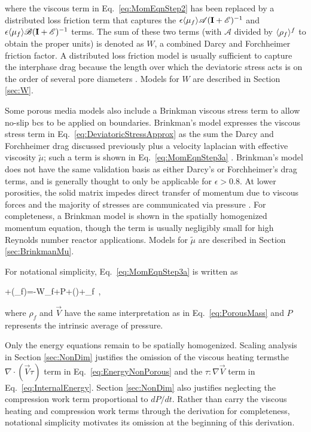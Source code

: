 \noindent where the viscous term in Eq.\ \eqref{eq:MomEqnStep2} has been replaced by a distributed loss friction term that captures the  \(\epsilon\langle\mu_f\rangle\mathscr{A}(\textbf{I}+\mathscr{E})^{-1}\) and \(\epsilon\langle\mu_f\rangle\mathscr{B}(\textbf{I}+\mathscr{E})^{-1}\) terms. The sum of these two terms (with \(\mathscr{A}\) divided by \(\langle\rho_f\rangle^f\) to obtain the proper units) is denoted as \(W\), a combined Darcy and Forchheimer friction factor. A distributed loss friction model is usually sufficient to capture the interphase drag because the length over which the deviatoric stress acts is on the order of several pore diameters \cite{kececioglu}. Models for \(W\) are described in Section \ref{sec:W}.

Some porous media models also include a Brinkman viscous stress term to allow no-slip \glspl{bc} to be applied on boundaries. Brinkman's model expresses the viscous stress term in Eq.\ \eqref{eq:DeviatoricStressApprox} as the sum the Darcy and Forchheimer drag discussed previously plus a velocity laplacian with effective viscosity \(\tilde{\mu}\); such a term is shown in Eq.\ \eqref{eq:MomEqnStep3a} \cite{nield,auwerda_2011,tecdoc1163}. Brinkman's model does not have the same validation basis as either Darcy's or Forchheimer's drag terms, and is generally thought to only be applicable for \(\epsilon>0.8\). At lower porosities, the solid matrix impedes direct transfer of momentum due to viscous forces and the majority of stresses are communicated via pressure \cite{nield}. For completeness, a Brinkman model is shown in the spatially homogenized momentum equation, though the term is usually negligibly small for high Reynolds number reactor applications. Models for \(\tilde{\mu}\) are described in Section \ref{sec:BrinkmanMu}.

For notational simplicity, Eq.\ \eqref{eq:MomEqnStep3a} is written as

\beq
\label{eq:MomEqnStep3}
+\nabla\cdot(\epsilon\rho_f)=-W\rho_f+\epsilon\nabla P+\nabla\cdot(\tilde{\mu}\nabla{})+\epsilon\rho_f\ ,
\eeq

\noindent where \(\rho_f\) and \(\vec{V}\) have the same interpretation as in Eq.\ \eqref{eq:PorousMass} and \(P\) represents the intrinsic average of pressure.

Only the energy equations remain to be spatially homogenized. Scaling analysis in Section \ref{sec:NonDim} justifies the omission of the viscous heating terms\mdash the \(\nabla\cdot(\vec{V}\tau)\) term in Eq.\ \eqref{eq:EnergyNonPorous} and the \(\tau\colon\nabla\vec{V}\) term in Eq.\ \eqref{eq:InternalEnergy}. Section \ref{sec:NonDim} also justifies neglecting the compression work term proportional to \(dP/dt\). Rather than carry the viscous heating and compression work terms through the derivation for completeness, notational simplicity motivates its omission at the beginning of this derivation. 

